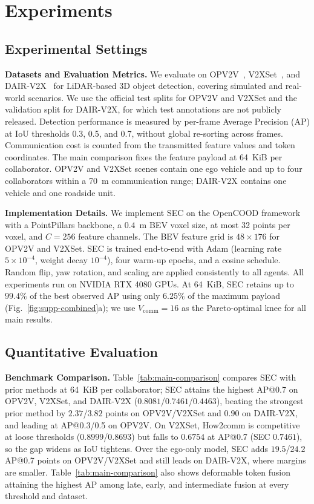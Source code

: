 
\section{Experiments}
\label{sec:experiments}





\subsection{Experimental Settings}
\label{sec:setup}
\noindent\textbf{Datasets and Evaluation Metrics.}
We evaluate on OPV2V~\cite{opv2v}, V2XSet~\cite{v2xvit}, and DAIR-V2X~\cite{dairv2x} for LiDAR-based 3D object detection, covering simulated and real-world scenarios. We use the official test splits for OPV2V and V2XSet and the validation split for DAIR-V2X, for which test annotations are not publicly released. Detection performance is measured by per-frame Average Precision (AP) at IoU thresholds 0.3, 0.5, and 0.7, without global re-sorting across frames. Communication cost is counted from the transmitted feature values and token coordinates. The main comparison fixes the feature payload at 64~KiB per collaborator. OPV2V and V2XSet scenes contain one ego vehicle and up to four collaborators within a 70~m communication range; DAIR-V2X contains one vehicle and one roadside unit.

\noindent\textbf{Implementation Details.}
We implement SEC on the OpenCOOD framework with a PointPillars backbone, a $0.4$~m BEV voxel size, at most 32 points per voxel, and $C{=}256$ feature channels. The BEV feature grid is $48\times176$ for OPV2V and V2XSet. SEC is trained end-to-end with Adam (learning rate $5\times10^{-4}$, weight decay $10^{-4}$), four warm-up epochs, and a cosine schedule. Random flip, yaw rotation, and scaling are applied consistently to all agents. All experiments run on NVIDIA RTX 4080 GPUs. At 64~KiB, SEC retains up to $99.4\%$ of the best observed AP using only $6.25\%$ of the maximum payload (Fig.~\ref{fig:supp-combined}a); we use $V_{\text{comm}}{=}16$ as the Pareto-optimal knee for all main results.




\subsection{Quantitative Evaluation}
\label{sec:main_results}
\noindent\textbf{Benchmark Comparison.}
Table~\ref{tab:main-comparison} compares SEC with prior methods at 64~KiB per collaborator; SEC attains the highest AP@0.7 on OPV2V, V2XSet, and DAIR-V2X ($0.8081$/$0.7461$/$0.4463$), beating the strongest prior method by $2.37$/$3.82$ points on OPV2V/V2XSet and $0.90$ on DAIR-V2X, and leading at AP@0.3/0.5 on OPV2V. On V2XSet, How2comm is competitive at loose thresholds ($0.8999$/$0.8693$) but falls to $0.6754$ at AP@0.7 (SEC $0.7461$), so the gap widens as IoU tightens. Over the ego-only model, SEC adds $19.5$/$24.2$ AP@0.7 points on OPV2V/V2XSet and still leads on DAIR-V2X, where margins are smaller. Table~\ref{tab:main-comparison} also shows deformable token fusion attaining the highest AP among late, early, and intermediate fusion at every threshold and dataset.

